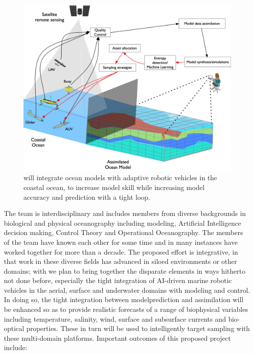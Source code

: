 \begin{figure}[!b]
  \centering
  \includegraphics[scale=0.15]{fig/ensemble.jpg}
  \caption{\proj will integrate ocean models with adaptive robotic vehicles
    in the coastal ocean, to increase model skill while increasing
    model accuracy and prediction with a tight loop.}
  \label{fig:block-diag}
\end{figure}


The \proj team is interdisciplinary and includes members from diverse
backgrounds in biological and physical oceanography including modeling,
Artificial Intelligence decision making, Control Theory and Operational
Oceanography. The members of the team have known each other for some
time and in many instances have worked together for more than a decade.
The proposed effort is integrative, in that work in these diverse fields
has advanced in siloed environments or other domains; with \proj we plan
to bring together the disparate elements in ways hitherto not done
before, especially the tight integration of AI-driven marine robotic
vehicles in the aerial, surface and underwater domains with modeling and
control. In doing so, the tight integration between modelprediction and
assimilation will be enhanced so as to provide realistic forecasts of a
range of biophysical variables including temperature, salinity, wind,
surface and subsurface currents and bio-optical properties. These in
turn will be used to intelligently target sampling with these
multi-domain platforms. Important outcomes of this proposed project
include:

